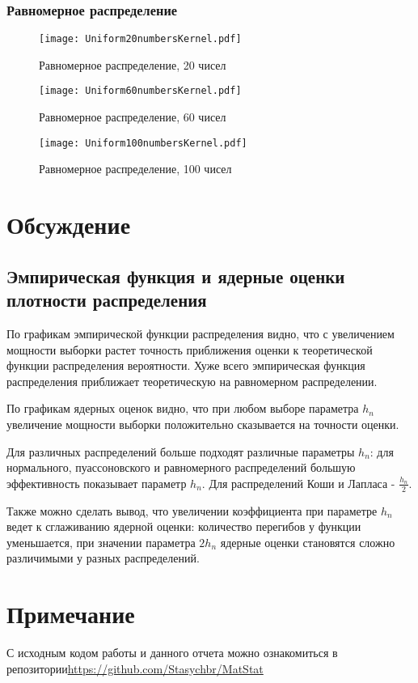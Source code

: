 \documentclass[a4paper,12pt]{article} %
\begin{document}
\subsubsection{Равномерное распределение}
\begin{figure}[H]
    \centering
    \texttt{[image: Uniform20numbersKernel.pdf]}
    \caption{Равномерное распределение, 20 чисел}
    \label{fig:uniformKer20}
\end{figure}
\begin{figure}[H]
    \centering
    \texttt{[image: Uniform60numbersKernel.pdf]}
    \caption{Равномерное распределение, 60 чисел}
    \label{fig:uniformKer60}
\end{figure}
\begin{figure}[H]
    \centering
    \texttt{[image: Uniform100numbersKernel.pdf]}
    \caption{Равномерное распределение, 100 чисел}
    \label{fig:uniformKer100}
\end{figure}
\section{Обсуждение}
\subsection{Эмпирическая функция и ядерные оценки плотности распределения}
По графикам эмпирической функции распределения видно, что с увеличением мощности выборки растет точность приближения оценки к теоретической функции распределения вероятности. Хуже всего эмпирическая функция распределения приближает теоретическую на равномерном распределении.

По графикам ядерных оценок видно, что при любом выборе параметра $h_n$ увеличение мощности выборки положительно сказывается на точности оценки. 

Для различных распределений больше подходят различные параметры $h_n$: для нормального, пуассоновского и равномерного распределений большую эффективность показывает параметр $h_n$. Для распределений Коши и Лапласа - $\frac{h_n}{2}$.

Также можно сделать вывод, что увеличении коэффициента при параметре $h_n$ ведет к сглаживанию ядерной оценки: количество перегибов у функции уменьшается, при значении параметра $2h_n$ ядерные оценки становятся сложно различимыми у разных распределений.
\section*{Примечание}
С исходным кодом работы и данного отчета можно ознакомиться в репозитории\;\url{https://github.com/Stasychbr/MatStat}
\end{document}
